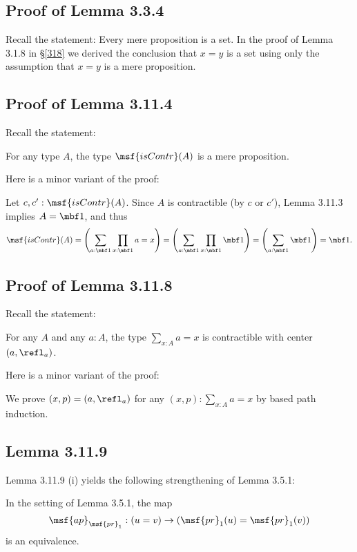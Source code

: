 \documentclass[12pt]{article}
\begin{document}

\subsection{Proof of Lemma 3.3.4}

Recall the statement: Every mere proposition is a set. In the proof of Lemma 3.1.8 in \S\ref{318} we derived the conclusion that $x=y$ is a set using only the assumption that $x=y$ is a mere proposition.


\subsection{Proof of Lemma 3.11.4} 

Recall the statement: 

For any type $A$, the type $\msf{isContr}(A)$ is a mere proposition.

Here is a minor variant of the proof:

Let $c,c':\msf{isContr}(A)$. Since $A$ is contractible (by $c$ or $c'$), Lemma 3.11.3 implies $A=\mbf1$, and thus 
$$
\msf{isContr}(A)=\left(\sum_{a:\mbf1}\prod_{x:\mbf1}a=x\right)=\left(\sum_{a:\mbf1}\prod_{x:\mbf1}\mbf1\right)=\left(\sum_{a:\mbf1}\mbf1\right)=\mbf1.
$$


\subsection{Proof of Lemma 3.11.8} 

Recall the statement: 

For any $A$ and any $a:A$, the type $\sum_{x:A}a=x$ is contractible with center $(a,\refl_a)$. 

Here is a minor variant of the proof:

We prove $(x,p)=(a,\refl_a)$ for any $(x,p):\sum_{x:A}a=x$ by based path induction.


\subsection{Lemma 3.11.9}

Lemma 3.11.9 (i) yields the following strengthening of Lemma 3.5.1:

In the setting of Lemma 3.5.1, the map 
$$
\msf{ap}_{\msf{pr}_1}:(u=v)\to(\msf{pr}_1(u)=\msf{pr}_1(v))
$$ 
is an equivalence.
\end{document}

